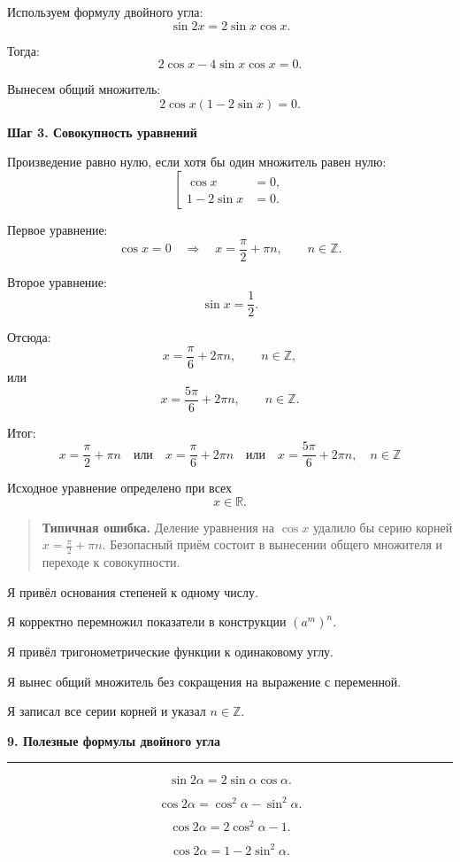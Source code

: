 \documentclass[a4paper,12pt]{article}
\newcommand{\topic}[1]{%
  \par\bigskip
  {\Large\bfseries\color{darkaccent}#1\par}
  \vspace{0.2em}
  {\color{accent}\rule{\linewidth}{0.7pt}}
  \vspace{0.55em}
}
\newcommand{\subtopic}[1]{%
  \par\medskip
  {\large\bfseries\color{darkaccent}#1\par}
  \vspace{0.2em}
}
\newcommand{\warning}[1]{%
  \begin{quote}
    \color{darkaccent}\textbf{Типичная ошибка.}\;
    \color{textgray}#1
  \end{quote}
}
\begin{document}
Используем формулу двойного угла:
\[
\sin 2x=2\sin x\cos x.
\]

Тогда:
\[
2\cos x-4\sin x\cos x=0.
\]

Вынесем общий множитель:
\[
2\cos x(1-2\sin x)=0.
\]

\subtopic{Шаг 3. Совокупность уравнений}

Произведение равно нулю, если хотя бы один множитель равен нулю:
\[
\left[
\begin{aligned}
\cos x&=0,\\
1-2\sin x&=0.
\end{aligned}
\right.
\]

Первое уравнение:
\[
\cos x=0
\quad\Longrightarrow\quad
x=\frac\pi2+\pi n,
\qquad n\in\mathbb Z.
\]

Второе уравнение:
\[
\sin x=\frac12.
\]

Отсюда:
\[
x=\frac\pi6+2\pi n,
\qquad n\in\mathbb Z,
\]
или
\[
x=\frac{5\pi}6+2\pi n,
\qquad n\in\mathbb Z.
\]

Итог:
\[
\boxed{
x=\frac\pi2+\pi n
\quad\text{или}\quad
x=\frac\pi6+2\pi n
\quad\text{или}\quad
x=\frac{5\pi}6+2\pi n,
\quad n\in\mathbb Z
}
\]

Исходное уравнение определено при всех
\[
x\in\mathbb R.
\]

\warning{Деление уравнения на \(\cos x\) удалило бы серию корней \(x=\frac\pi2+\pi n\). Безопасный приём состоит в вынесении общего множителя и переходе к совокупности.}

\begin{checklist}
  \item Я привёл основания степеней к одному числу.
  \item Я корректно перемножил показатели в конструкции \((a^m)^n\).
  \item Я привёл тригонометрические функции к одинаковому углу.
  \item Я вынес общий множитель без сокращения на выражение с переменной.
  \item Я записал все серии корней и указал \(n\in\mathbb Z\).
\end{checklist}

\topic{9. Полезные формулы двойного угла}

\[
\sin 2\alpha
=
2\sin\alpha\cos\alpha.
\]

\[
\cos 2\alpha
=
\cos^2\alpha-\sin^2\alpha.
\]

\[
\cos 2\alpha
=
2\cos^2\alpha-1.
\]

\[
\cos 2\alpha
=
1-2\sin^2\alpha.
\]
\end{document}

